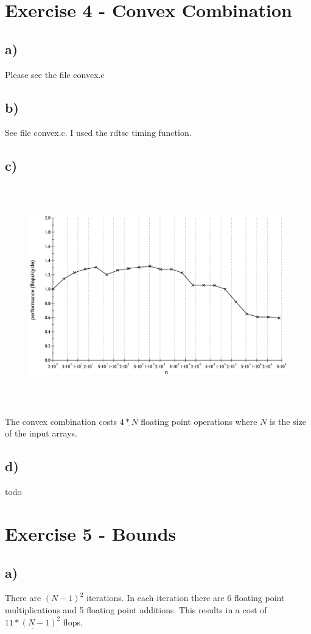 \documentclass[10pt,a4paper,oneside,notitlepage]{report}
\begin{document}
\section*{Exercise 4 - Convex Combination}
\subsection*{a)}
Please see the file convex.c
\subsection*{b)}
See file convex.c. I used the rdtsc timing function.
\subsection*{c)}
\begin{figure}[H]
\caption{}
\includegraphics[height=9.5cm]{convex_performance}
\end{figure}
The convex combination costs $\underline{4*N}$ floating point operations where $N$ is the size of the input arrays.
\subsection*{d)}
todo

\section*{Exercise 5 - Bounds}
\subsection*{a)}
There are $(N-1)^2$ iterations. In each iteration there are 6 floating point multiplications and 5 floating point additions. This results in a cost of $\underline{11*(N-1)^2}$ flops.
\end{document}
